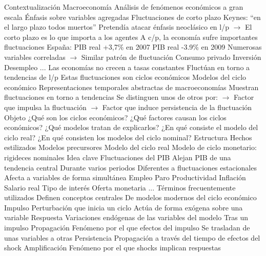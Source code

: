 \documentclass{nuevotema}
\begin{document}
\begin{esquemal}
	\1[] 
		\2 Contextualización
			\3 Macroeconomía
				\4 Análisis de fenómenos económicos a gran escala
				\4 Énfasis sobre variables agregadas
			\3 Fluctuaciones de corto plazo
				\4 Keynes: ``en el largo plazo todos muertos''
				\4[] Pretendía atacar énfasis neoclásico en l/p
				\4[] $\to$ El corto plazo es lo que importa a los agentes
				\4 A c/p, la economía sufre importantes fluctuaciones
				\4 España:
				\4[] PIB real +3,7\% en 2007
				\4[] PIB real -3.9\% en 2009
				\4 Numerosas variables correladas
				\4[] $\to$ Similar patrón de fluctuación
				\4[] Consumo privado
				\4[] Inversión
				\4[] Desempleo
				\4[] ...
				\4[$\Rightarrow$] Las economías no crecen a tasas constantes
				\4[$\Rightarrow$] Fluctúan en torno a tendencias de l/p
				\4[$\Rightarrow$] Estas fluctuaciones son ciclos económicos
			\3 Modelos del ciclo económico
				\4 Representaciones temporales abstractas de macroeconomías
				\4 Muestran fluctuaciones en torno a tendencias
				\4 Se distinguen unos de otros por:
				\4[] $\to$ Factor que impulsa la fluctuación
				\4[] $\to$ Factor que induce persistencia de la fluctuación
		\2 Objeto
			\3 ¿Qué son los ciclos económicos?
			\3 ¿Qué factores causan los ciclos económicos?
			\3 ¿Qué modelos tratan de explicarlos?
			\3 ¿En qué consiste el modelo del ciclo real?
			\3 ¿En qué consisten los modelos del ciclo nominal?
		\2 Estructura
			\3 Hechos estilizados
			\3 Modelos precursores
			\3 Modelo del ciclo real
			\3 Modelo de ciclo monetario: rigideces nominales
	\1 
		\2 Idea clave
			\3 Fluctuaciones del PIB
				\4 Alejan PIB de una tendencia central
				\4 Durante varios periodos
				\4 Diferentes a fluctuaciones estacionales
			\3 Afecta a variables de forma simultánea
				\4 Empleo
				\4 Paro
				\4 Productividad
				\4 Inflación
				\4 Salario real
				\4 Tipo de interés
				\4 Oferta monetaria
				\4 ...
			\3 Términos frecuentemente utilizados
				\4 Definen conceptos centrales
				\4[] De modelos modernos del ciclo económico
				\4 Impulso
				\4[] Perturbación que inicia un ciclo
				\4[] Actúa de forma exógena sobre una variable
				\4 Respuesta
				\4[] Variaciones endógenas de las variables del modelo
				\4[] Tras un impulso
				\4 Propagación
				\4[] Fenómeno por el que efectos del impulso
				\4[] Se trasladan de unas variables a otras
				\4 Persistencia
				\4[] Propagación a través del tiempo
				\4[] de efectos del shock
				\4 Amplificación
				\4[] Fenómeno por el que shocks implican respuestas

\end{esquemal}
\end{document}
